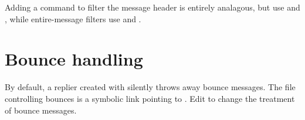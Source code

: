Adding a command to filter the message header is entirely analagous,
but use  and
, while entire-message filters use
 and .


\section{Bounce handling}
By default, a replier created with  silently
throws away bounce messages.  The  file controlling
bounces is a symbolic link pointing to .  Edit
 to change the treatment of bounce messages.


